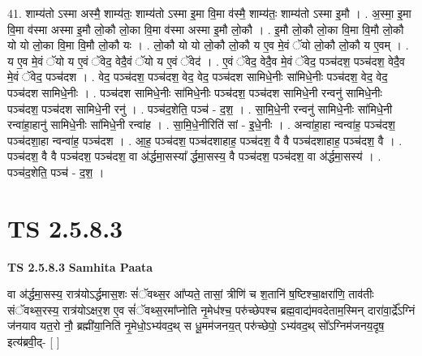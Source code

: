 \documentclass[17pt]{extarticle}
\begin{document}
41. शाम्य॑तो ऽस्मा अस्मै॒ शाम्य॑तः॒ शाम्य॑तो ऽस्मा इ॒मा वि॒मा व॑स्मै॒ शाम्य॑तः॒ शाम्य॑तो ऽस्मा इ॒मौ । . अ॒स्मा॒ इ॒मा वि॒मा व॑स्मा अस्मा इ॒मौ लो॒कौ लो॒का वि॒मा व॑स्मा अस्मा इ॒मौ लो॒कौ । . इ॒मौ लो॒कौ लो॒का वि॒मा वि॒मौ लो॒कौ यो यो लो॒का वि॒मा वि॒मौ लो॒कौ यः । . लो॒कौ यो यो लो॒कौ लो॒कौ य ए॒व मे॒वं ॅयो लो॒कौ लो॒कौ य ए॒वम् । . य ए॒व मे॒वं ॅयो य ए॒वं ॅवेद॒ वेदै॒वं ॅयो य ए॒वं ॅवेद॑ । . ए॒वं ॅवेद॒ वेदै॒व मे॒वं ॅवेद॒ पञ्च॑दश॒ पञ्च॑दश॒ वेदै॒व मे॒वं ॅवेद॒ पञ्च॑दश । . वेद॒ पञ्च॑दश॒ पञ्च॑दश॒ वेद॒ वेद॒ पञ्च॑दश सामिधे॒नीः सा॑मिधे॒नीः पञ्च॑दश॒ वेद॒ वेद॒ पञ्च॑दश सामिधे॒नीः । . पञ्च॑दश सामिधे॒नीः सा॑मिधे॒नीः पञ्च॑दश॒ पञ्च॑दश सामिधे॒नी रन्वनु॑ सामिधे॒नीः पञ्च॑दश॒ पञ्च॑दश सामिधे॒नी रनु॑ । . पञ्च॑द॒शेति॒ पञ्च॑ - द॒श॒ । . सा॒मि॒धे॒नी रन्वनु॑ सामिधे॒नीः सा॑मिधे॒नी रन्वा॑हा॒हानु॑ सामिधे॒नीः सा॑मिधे॒नी रन्वा॑ह । . सा॒मि॒धे॒नीरिति॑ सां - इ॒धे॒नीः । . अन्वा॑हा॒हा न्वन्वा॑ह॒ पञ्च॑दश॒ पञ्च॑दशा॒हा न्वन्वा॑ह॒ पञ्च॑दश । . आ॒ह॒ पञ्च॑दश॒ पञ्च॑दशाहाह॒ पञ्च॑दश॒ वै वै पञ्च॑दशाहाह॒ पञ्च॑दश॒ वै । . पञ्च॑दश॒ वै वै पञ्च॑दश॒ पञ्च॑दश॒ वा अ॑र्द्धमा॒सस्या᳚ र्द्धमा॒सस्य॒ वै पञ्च॑दश॒ पञ्च॑दश॒ वा अ॑र्द्धमा॒सस्य॑ । . पञ्च॑द॒शेति॒ पञ्च॑ - द॒श॒ । \newline
\pagebreak
{}

\section{ TS 2.5.8.3 }

\textbf{TS 2.5.8.3 } \newline
\textbf{Samhita Paata} \newline

वा अ॑र्द्धमा॒सस्य॒ रात्र॑योऽर्द्धमास॒शः सं॑ॅवथ्स॒र आ᳚प्यते॒ तासां॒ त्रीणि॑ च श॒तानि॑ ष॒ष्टिश्चा॒क्षरा॑णि॒ ताव॑तीः संॅवथ्स॒रस्य॒ रात्र॑योऽक्षर॒श ए॒व सं॑ॅवथ्स॒रमा᳚प्नोति नृ॒मेध॑श्च॒ परु॑च्छेपश्च ब्रह्म॒वाद्य॑मवदेताम॒स्मिन् दारा॑वा॒र्द्रे᳚ऽग्निं ज॑नयाव यत॒रो नौ॒ ब्रह्मी॑या॒निति॑ नृ॒मेधो॒ऽभ्य॑वद॒थ् स धू॒मम॑जनय॒त् परु॑च्छेपो॒ ऽभ्य॑वद॒थ् सो᳚ऽग्निम॑जनय॒दृष॒ इत्य॑ब्रवी॒द्-  [  ] \newline
\end{document}
